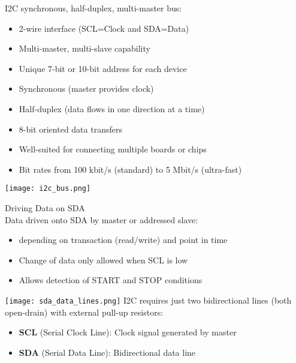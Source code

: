 \begin{definition}{I2C} synchronous, half-duplex, multi-master bus:

\begin{minipage}{0.5\linewidth}
\begin{itemize}
    \item 2-wire interface (SCL=Clock and SDA=Data)
    \item Multi-master, multi-slave capability
    \item Unique 7-bit or 10-bit address for each device
    \item Synchronous (master provides clock)
\end{itemize}
\end{minipage}
\begin{minipage}{0.5\linewidth}
\begin{itemize}
    \item Half-duplex (data flows in one direction at a time)
    \item 8-bit oriented data transfers
    \item Well-suited for connecting multiple boards or chips
    \item Bit rates from 100 kbit/s (standard) to 5 Mbit/s (ultra-fast)
\end{itemize}
\end{minipage}

\texttt{[image: i2c\_bus.png]}
\end{definition}


\begin{concept}{Driving Data on SDA}\\
    Data driven onto SDA by master or addressed slave:
    \begin{itemize}
        \item depending on transaction (read/write) and point in time
        \item Change of data only allowed when SCL is low
        \item Allows detection of START and STOP conditions
    \end{itemize}
\texttt{[image: sda\_data\_lines.png]}
I2C requires just two bidirectional lines (both open-drain) with external pull-up resistors:
\begin{itemize}
    \item \textbf{SCL} (Serial Clock Line): Clock signal generated by master
    \item \textbf{SDA} (Serial Data Line): Bidirectional data line
\end{itemize}
\end{concept}

